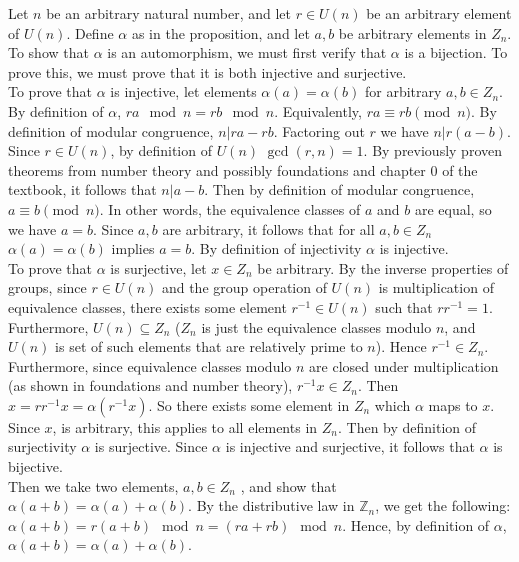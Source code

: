 \documentclass{article}
\newcommand{\Z}{\mathbb{Z}}
\begin{document}
 Let $n$ be an arbitrary natural number, and let $r\in U(n)$ be an arbitrary element of $U(n)$. Define $\alpha$ as in the proposition, and let $a,b$ be arbitrary elements in $Z_n$. \\

To show that $\alpha$ is an automorphism, we must first verify that $\alpha$ is a bijection. To prove this, we must prove that it is both injective and surjective. \\

To prove that $\alpha$ is injective, let elements $\alpha(a) = \alpha(b)$ for arbitrary $a,b\in Z_n$. By definition of $\alpha$, $ra\mod n = rb\mod n$. Equivalently, $ra \equiv rb \pmod{n}$. By definition of modular congruence,  $n|ra-rb$. Factoring out $r$ we have $n|r(a-b).$ Since $r\in U(n)$, by definition of $U(n)$ $\gcd(r,n) = 1$. By previously proven theorems from number theory and possibly foundations and chapter 0 of the textbook, it follows that $n|a-b$. Then by definition of modular congruence, $a\equiv b \pmod{n}$. In other words, the equivalence classes of $a$ and $b$ are equal, so we have $a = b$. Since $a,b$ are arbitrary, it follows that for all $a,b\in Z_n$ $\alpha(a) = \alpha(b)$ implies $a = b$. By definition of injectivity $\alpha$ is injective.\\

To prove that $\alpha$ is surjective, let $x\in Z_n$ be arbitrary. By the inverse properties of groups, since $r\in U(n)$ and the group operation of $U(n)$ is multiplication of equivalence classes, there exists some element $r^{-1}\in U(n)$ such that $rr^{-1} = 1$. Furthermore, $U(n) \subseteq Z_n$ ($Z_n$ is just the equivalence classes modulo $n$, and $U(n)$ is set of such elements that are relatively prime to $n$). Hence $r^{-1}\in Z_n$. Furthermore, since equivalence classes modulo $n$ are closed under multiplication (as shown in foundations and number theory), $r^{-1}x\in Z_n$. Then $x = rr^{-1}x = \alpha(r^{-1}x)$. So there exists some element in $Z_n$ which $\alpha$ maps to $x$. Since $x$, is arbitrary, this applies to all elements in $Z_n$. Then by definition of surjectivity $\alpha$ is surjective. Since $\alpha$ is injective and surjective, it follows that $\alpha$ is bijective. \\


Then we take two elements, $a,b\in Z_n$ , and show that $\alpha(a+b) = \alpha(a) + \alpha(b).$ By the distributive law in $\Z_n$, we get the following:  $\alpha(a+b) = r(a+b) \mod n = (ra + rb) \mod n$. Hence, by definition of $\alpha$, $\alpha(a+b)=\alpha(a)+\alpha(b)$. \\
\end{document}
